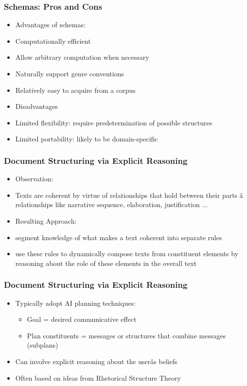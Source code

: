 \documentclass[compress,color=usenames]{beamer}
\begin{document}
\begin{frame}
\frametitle{Schemas: Pros and Cons}

\label{f148}
\begin{itemize}
\item { {Advantages of schemas:}}
\item { {Computationally efficient}}
\item { {Allow arbitrary computation when necessary}}
\item { {Naturally support genre conventions}}
\item { {Relatively easy to acquire from a corpus}}
\item { {Disadvantages}}
\item { {Limited flexibility: require predetermination of possible structures}}
\item { {Limited portability: likely to be domain-specific}}
\end{itemize}
 
\end{frame}

\begin{frame}
\frametitle{Document Structuring via Explicit Reasoning}

\label{f150}
\begin{itemize}
\item { {Observation:}}
\item { {Texts are coherent by virtue of relationships that hold between their parts \^a relationships like narrative sequence, elaboration, justification ...}}
\item { {Resulting Approach:}}
\item { {segment knowledge of what makes a text coherent into separate rules }}
\item { {use these rules to dynamically compose texts from constituent elements by reasoning about the role of these elements in the overall text}}
\end{itemize}
 \end{frame}

\begin{frame}
\frametitle{Document Structuring via Explicit Reasoning}

\label{f152}
\begin{itemize}
\item { {Typically adopt AI planning techniques:}}
\begin{itemize}
\item Goal = desired communicative effect
\item Plan constituents = messages or structures that combine messages (subplans)
\end{itemize}
\item { {Can involve explicit reasoning about the user\^as beliefs}}
\item { {Often based on ideas from Rhetorical Structure Theory}}
\end{itemize}
 
\end{frame}
\end{document}
